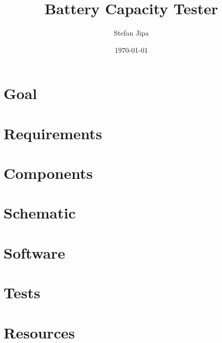 \documentclass[11pt,a4paper]{article}
\title{Battery Capacity Tester}
\author{Stefan Jipa}
\date{\today}
\begin{document}
\maketitle
\tableofcontents
\newpage

\section{Goal}

\section{Requirements}

\section{Components}

\section{Schematic}

\section{Software}

\section{Tests}

\section{Resources}
\end{document}
